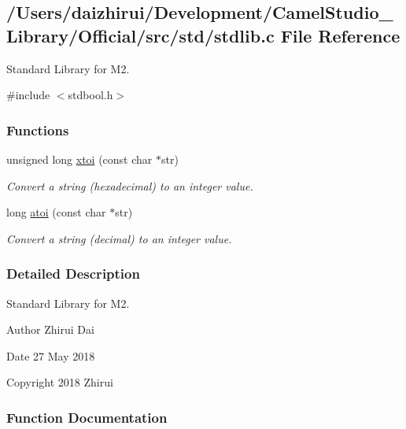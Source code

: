 \hypertarget{a00113}{}\subsection{/\+Users/daizhirui/\+Development/\+Camel\+Studio\+\_\+\+Library/\+Official/src/std/stdlib.c File Reference}
\label{a00113}


Standard Library for M2.  


{\ttfamily \#include $<$stdbool.\+h$>$}\newline
\subsubsection*{Functions}
\begin{DoxyCompactItemize}
\item 
unsigned long \mbox{\hyperlink{a00113_a9d6165da864d16ad50c13690c1e7d7ea}{xtoi}} (const char $\ast$str)
\begin{DoxyCompactList}\small\item\em Convert a string (hexadecimal) to an integer value. \end{DoxyCompactList}\item 
long \mbox{\hyperlink{a00113_a36f90d5de53f568b0fc5266ce013b9c5}{atoi}} (const char $\ast$str)
\begin{DoxyCompactList}\small\item\em Convert a string (decimal) to an integer value. \end{DoxyCompactList}\end{DoxyCompactItemize}


\subsubsection{Detailed Description}
Standard Library for M2. 

\begin{DoxyAuthor}{Author}
Zhirui Dai 
\end{DoxyAuthor}
\begin{DoxyDate}{Date}
27 May 2018 
\end{DoxyDate}
\begin{DoxyCopyright}{Copyright}
2018 Zhirui 
\end{DoxyCopyright}


\subsubsection{Function Documentation}
\mbox{\label{a00113_a36f90d5de53f568b0fc5266ce013b9c5}} 
